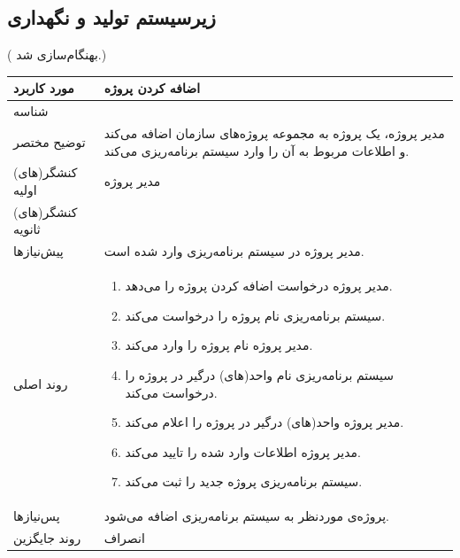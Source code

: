 \subsection{زیرسیستم تولید و نگهداری}
({\color{red} بهنگام‌سازی شد.})
\begin{table}[H]
	\centering
	\begin{tabular}{|p{3cm}|p{10cm}|}
		\hline
		
		
		مورد کاربرد	& اضافه کردن پروژه  \\
		\hline
		
		شناسه & 
		\stepcounter{usecase_ID}
		
		\arabic{usecase_ID} \\
		
		\hline
		
		توضیح مختصر & مدیر پروژه، یک پروژه به مجموعه پروژه‌های سازمان اضافه می‌کند و اطلاعات مربوط به آن را وارد سیستم برنامه‌ریزی می‌کند. \\
		\hline
		
		کنشگر(های) اولیه & مدیر پروژه \\
		\hline
		
		کنشگر(های) ثانویه&  \\
		\hline
		
		پیش‌نیازها &
		مدیر پروژه در سیستم برنامه‌ریزی وارد شده است.\\
		\hline
		
		
		روند اصلی &
		\begin{enumerate}[topsep=0cm,leftmargin=0.5cm]
			\item مدیر پروژه درخواست اضافه کردن پروژه را می‌دهد.
			\item سیستم برنامه‌ریزی نام پروژه را درخواست می‌کند.
			\item مدیر پروژه نام پروژه را وارد می‌کند. 
			\item سیستم برنامه‌ریزی نام واحد(های) درگیر در پروژه را درخواست می‌کند. 
			\item مدیر پروژه واحد(های) درگیر در پروژه را اعلام می‌کند. 
			\item  مدیر پروژه اطلاعات وارد شده را تایید می‌کند. 
			\item سیستم برنامه‌ریزی پروژه جدید را ثبت می‌کند.
		\end{enumerate} \\
		
		\hline
		
		پس‌نیازها &
		پروژه‌ی موردنظر به سیستم برنامه‌ریزی اضافه می‌شود. \\
		\hline
		
		روند جایگزین & انصراف \\
		\hline
		
	\end{tabular}
\end{table}

